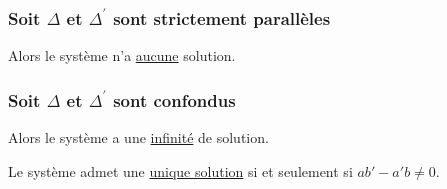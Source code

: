 \documentclass[french]{book}
\begin{document}
\subsubsection*{Soit $\Delta$ et $\Delta^{'}$ sont strictement parallèles}
Alors le système n'a \underline{aucune} solution.
\subsubsection*{Soit $\Delta$ et $\Delta^{'}$ sont confondus}
Alors le système a une \underline{infinité} de solution.

\begin{prop}
Le système admet une \underline{unique solution}  si et seulement si $ab'-a'b \neq 0$.
\end{prop}
\end{document}
